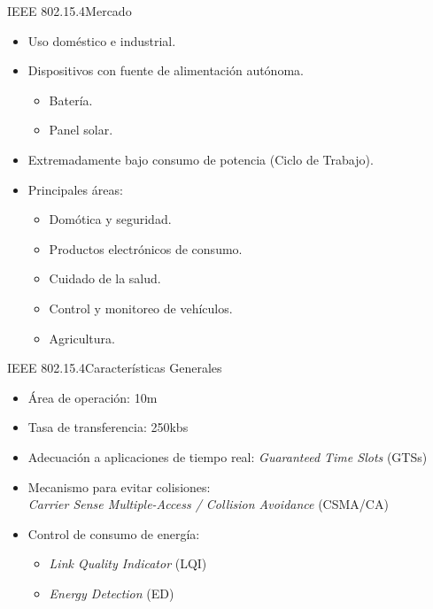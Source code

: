 \documentclass[aspectratio=169]{beamer}
\begin{document}
\begin{frame}{IEEE 802.15.4}{Mercado}
	\begin{itemize}
		\item Uso doméstico e industrial.
		\vspace{5px}
		\item Dispositivos con fuente de alimentación autónoma.
		\begin{itemize}
			\item Batería.
			\item Panel solar.
		\end{itemize}
		\vspace{5px}
		\item Extremadamente bajo consumo de potencia (Ciclo de Trabajo).
		\vspace{5px}
		\item Principales áreas:
		\begin{itemize}
			\item Domótica y seguridad.
			\item Productos electrónicos de consumo.
			\item Cuidado de la salud.
			\item Control y monitoreo de vehículos.
			\item Agricultura.
		\end{itemize}
	\end{itemize}
	
\end{frame}

\begin{frame}{IEEE 802.15.4}{Características Generales}
	
	\begin{itemize}
		\item Área de operación: 10m
		\vspace{5px}
		\item Tasa de transferencia: 250kbs
		\vspace{5px}
		\item Adecuación a aplicaciones de tiempo real: \textit{Guaranteed Time Slots} (GTSs)
		\vspace{5px}
		\item Mecanismo para evitar colisiones:\\ \textit{Carrier Sense Multiple-Access / Collision Avoidance} (CSMA/CA)
		\vspace{5px}
		\item Control de consumo de energía: 
		\begin{itemize}
			\item \textit{Link Quality Indicator} (LQI)
			\item \textit{Energy Detection} (ED)
		\end{itemize}
	\end{itemize}
	
\end{frame}
\end{document}

